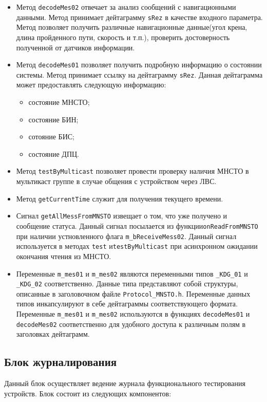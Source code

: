 \begin{itemize}
	\item Метод \texttt{decodeMes02} отвечает за анализ сообщений с навигационными данными. Метод принимает
		дейтаграмму \texttt{sRez} в качестве входного параметра. Метод позволяет получить
		различные навигационные данные(угол крена, длина пройденного пути, скорость и т.п.),
		проверить достоверность полученной от датчиков информации.

	\item Метод \texttt{decodeMes01} позволяет получить подробную информацию о состоянии системы. Метод принимает
		ссылку на дейтаграмму \texttt{sRez}. Данная
		дейтаграмма может предоставлять следующую информацию:
		\begin{itemize}
				\item состояние МНСТО;
				\item состояние БИН;
				\item сотояние БИС;
				\item состояние ДПЦ.
		\end{itemize}

	\item Метод \texttt{testByMulticast} позволяет провести проверку наличия МНСТО в мультикаст группе в случае
		общения с устройством через ЛВС.

	\item Метод \texttt{getCurrentTime} служит для получения текущего времени.

	\item Сигнал \texttt{getAllMessFromMNSTO} извещает о том, что уже получено и сообщение статуса. Данный сигнал
		посылается из функции\break \texttt{onReadFromMNSTO} при наличии
		устновленного флага\break
		\texttt{m\_bReceiveMess02}. Данный сигнал используется в методах
		\texttt{test} и\break \texttt{testByMulticast} при асинхронном ожидании окончания чтения из МНСТО.

	\item Переменные \texttt{m\_mes01} и \texttt{m\_mes02} являются переменными типов \texttt{\_KDG\_01} и
		\texttt{\_KDG\_02} соответственно. Данные типа представляют собой структуры, описанные в заголовочном
		файле \texttt{Protocol\_MNSTO.h}. Переменные данных типов инкапсулируют в себе дейтаграммы
		соответствующего формата. Переменные \texttt{m\_mes01} и \texttt{m\_mes02} используются в функциях
		\texttt{decodeMes01} и \texttt{decodeMes02} соответственно для удобного доступа к различным полям в
		заголовках дейтаграмм.
\end{itemize}

\subsection{Блок журналирования}
Данный блок осуществляет ведение журнала функционального тестирования устройств. Блок состоит из следующих компонентов:


